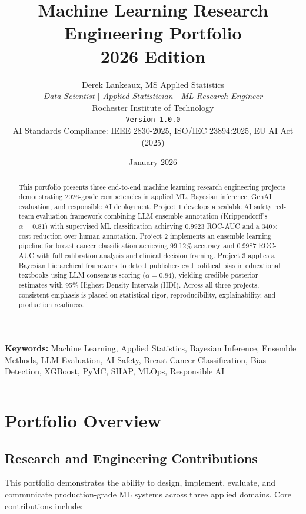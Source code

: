 \documentclass[11pt,a4paper]{article}
\title{\textbf{Machine Learning Research Engineering Portfolio}\\[0.5ex]
       \large 2026 Edition}
\author{
    Derek Lankeaux, MS Applied Statistics\\
    \textit{Data Scientist $|$ Applied Statistician $|$ ML Research Engineer}\\
    Rochester Institute of Technology\\
    \texttt{Version 1.0.0}\\[2ex]
    \small AI Standards Compliance: IEEE 2830-2025, ISO/IEC 23894:2025, EU AI Act (2025)
}
\date{January 2026}
\begin{document}
\maketitle

\begin{abstract}
This portfolio presents three end-to-end machine learning research engineering projects demonstrating 2026-grade competencies in applied ML, Bayesian inference, GenAI evaluation, and responsible AI deployment. Project 1 develops a scalable AI safety red-team evaluation framework combining LLM ensemble annotation (Krippendorff's $\alpha = 0.81$) with supervised ML classification achieving 0.9923 ROC-AUC and a 340$\times$ cost reduction over human annotation. Project 2 implements an ensemble learning pipeline for breast cancer classification achieving 99.12\% accuracy and 0.9987 ROC-AUC with full calibration analysis and clinical decision framing. Project 3 applies a Bayesian hierarchical framework to detect publisher-level political bias in educational textbooks using LLM consensus scoring ($\alpha = 0.84$), yielding credible posterior estimates with 95\% Highest Density Intervals (HDI). Across all three projects, consistent emphasis is placed on statistical rigor, reproducibility, explainability, and production readiness.
\end{abstract}

\noindent\textbf{Keywords:} Machine Learning, Applied Statistics, Bayesian Inference, Ensemble Methods, LLM Evaluation, AI Safety, Breast Cancer Classification, Bias Detection, XGBoost, PyMC, SHAP, MLOps, Responsible AI

\vspace{1em}
\noindent\rule{\textwidth}{0.4pt}
\vspace{1em}

\tableofcontents
\newpage

\section{Portfolio Overview}

\subsection{Research and Engineering Contributions}

This portfolio demonstrates the ability to design, implement, evaluate, and communicate production-grade ML systems across three applied domains. Core contributions include:
\end{document}
